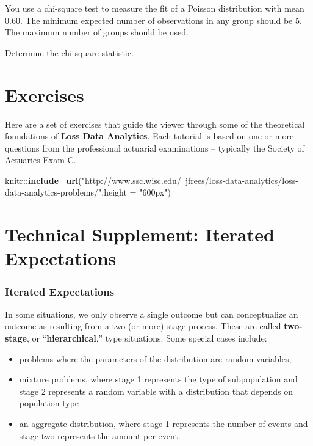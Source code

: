 \documentclass[]{book}
\newenvironment{Shaded}{\begin{snugshade}}{\end{snugshade}}
\newcommand{\KeywordTok}[1]{\textcolor[rgb]{0.13,0.29,0.53}{\textbf{{#1}}}}
\newcommand{\DataTypeTok}[1]{\textcolor[rgb]{0.13,0.29,0.53}{{#1}}}
\newcommand{\StringTok}[1]{\textcolor[rgb]{0.31,0.60,0.02}{{#1}}}
\newcommand{\NormalTok}[1]{{#1}}
\theoremstyle{definition}
\theoremstyle{definition}
\theoremstyle{definition}
\theoremstyle{remark}
\begin{document}
You use a chi-square test to measure the fit of a Poisson distribution
with mean 0.60. The minimum expected number of observations in any group
should be 5. The maximum number of groups should be used.

Determine the chi-square statistic.

\section{Exercises}\label{exercises}

Here are a set of exercises that guide the viewer through some of the
theoretical foundations of \textbf{Loss Data Analytics}. Each tutorial
is based on one or more questions from the professional actuarial
examinations -- typically the Society of Actuaries Exam C.

\begin{Shaded}
\begin{Highlighting}[]
\NormalTok{knitr::}\KeywordTok{include_url}\NormalTok{(}\StringTok{"http://www.ssc.wisc.edu/~jfrees/loss-data-analytics/loss-data-analytics-problems/"}\NormalTok{,}\DataTypeTok{height =} \StringTok{"600px"}\NormalTok{)}
\end{Highlighting}
\end{Shaded}

\section{Technical Supplement: Iterated
Expectations}\label{technical-supplement-iterated-expectations}

\subsubsection{Iterated Expectations}\label{iterated-expectations}

In some situations, we only observe a single outcome but can
conceptualize an outcome as resulting from a two (or more) stage
process. These are called \textbf{two-stage}, or
``\textbf{hierarchical},'' type situations. Some special cases include:

\begin{itemize}
\item
  problems where the parameters of the distribution are random
  variables,
\item
  mixture problems, where stage 1 represents the type of subpopulation
  and stage 2 represents a random variable with a distribution that
  depends on population type
\item
  an aggregate distribution, where stage 1 represents the number of
  events and stage two represents the amount per event.
\end{itemize}
\end{document}
